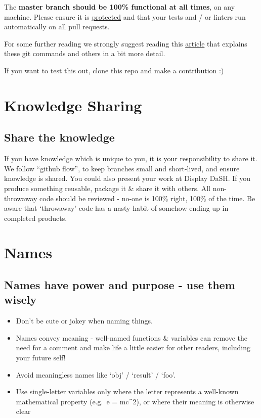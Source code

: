 \documentclass[]{book}
\providecommand{\tightlist}{%
  \setlength{\itemsep}{0pt}\setlength{\parskip}{0pt}}
\begin{document}
The \textbf{master branch should be 100\% functional at all times}, on any machine. Please ensure it is \href{https://help.github.com/articles/about-protected-branches/}{protected} and that your tests and / or linters run automatically on all pull requests.

For some further reading we strongly suggest reading this \href{https://gist.github.com/blackfalcon/8428401}{article} that explains these git commands and others in a bit more detail.

If you want to test this out, clone this repo and make a contribution :)

\hypertarget{knowledge}{%
\section{Knowledge Sharing}\label{knowledge}}

\hypertarget{share-the-knowledge}{%
\subsection{Share the knowledge}\label{share-the-knowledge}}

If you have knowledge which is unique to you, it is your responsibility to share it.
We follow ``github flow'', to keep branches small and short-lived, and ensure knowledge is shared.
You could also present your work at Display DaSH.
If you produce something reusable, package it \& share it with others.
All non-throwaway code should be reviewed - no-one is 100\% right, 100\% of the time.
Be aware that `throwaway' code has a nasty habit of somehow ending up in completed products.

\hypertarget{names}{%
\section{Names}\label{names}}

\hypertarget{names-have-power-and-purpose---use-them-wisely}{%
\subsection{Names have power and purpose - use them wisely}\label{names-have-power-and-purpose---use-them-wisely}}

\begin{itemize}
\tightlist
\item
  Don't be cute or jokey when naming things.
\item
  Names convey meaning - well-named functions \& variables can remove the need for a comment and make life a little easier for other readers, including your future self!
\item
  Avoid meaningless names like `obj' / `result' / `foo'.
\item
  Use single-letter variables only where the letter represents a well-known mathematical property (e.g.~e = mc\^{}2), or where their meaning is otherwise clear
\end{itemize}
\end{document}
